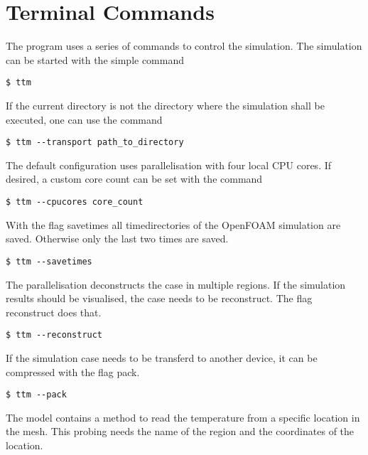 \documentclass[%
FTMstudentthesis%
,optArial%
,optBiber%
,optEnglish%
,optCMYK%
]{FTMlatex}%
\begin{document}
\section{Terminal Commands}
%
The program uses a series of commands to control the simulation. The simulation can be started with the simple command
%
\begin{code}
\begin{lstlisting}[style =BASH]
	$ ttm
\end{lstlisting}
\end{code}
%
If the current directory is not the directory where the simulation shall be executed, one can use the command
%
\begin{code}
\begin{lstlisting}[style =BASH]
$ ttm --transport path_to_directory
\end{lstlisting}
\end{code}
%
The default configuration uses parallelisation with four local CPU cores. If desired, a custom core count can be set with the command
%
\begin{code}
\begin{lstlisting}[style =BASH]
$ ttm --cpucores core_count
\end{lstlisting}
\end{code}%
%
With the flag savetimes all timedirectories of the OpenFOAM simulation are saved. Otherwise only the last two times are saved.
\begin{code}
\begin{lstlisting}[style =BASH]
$ ttm --savetimes
\end{lstlisting}
\end{code}%
%
The parallelisation deconstructs the case in multiple regions. If the simulation results should be visualised, the case needs to be reconstruct. The flag reconstruct does that.
% 
\begin{code}
\begin{lstlisting}[style =BASH]
$ ttm --reconstruct
\end{lstlisting}
\end{code}%
%
If the simulation case needs to be transferd to another device, it can be compressed with the flag pack.
% 
\begin{code}
\begin{lstlisting}[style =BASH]
$ ttm --pack
\end{lstlisting}
\end{code}%
%
The model contains a method to read the temperature from a specific location in the mesh. This probing needs the name of the region and the coordinates of the location.
\end{document}
